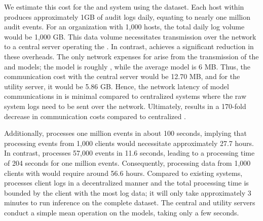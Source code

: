  We estimate this cost for the \flash and \kairos system using the \optc dataset. Each host within \optc produces approximately 1GB of audit logs daily, equating to nearly one million audit events. For an organization with 1,000 hosts, the total daily log volume would be 1,000 GB. This data volume necessitates transmission over the network to a central server operating the \pids. In contrast, \Sys achieves a significant reduction in these overheads. The only network expenses for \Sys arise from the transmission of the \gnnshort and \wordvec models; the \gnnshort model is roughly \modelsize, while the average \wordvec model is 6 MB. Thus, the communication cost with the central server would be 12.70 MB, and for the utility server, it would be 5.86 GB. Hence, the network latency of model communications in \Sys is minimal compared to centralized systems where the raw system logs need to be sent over the network. Ultimately, \Sys results in a 170-fold decrease in communication costs compared to centralized \pids.  

 Additionally, \flash processes one million events in about 100 seconds, implying that processing events from 1,000 clients would necessitate approximately 27.7 hours. In contrast, \kairos processes 57,000 events in 11.6 seconds, leading to a processing time of 204 seconds for one million events. Consequently, processing data from 1,000 clients with \kairos would require around 56.6 hours. Compared to existing systems, \Sys processes client logs in a decentralized manner and the total processing time is bounded by the client with the most log data; it will only take approximately 3 minutes to run inference on the complete \optc dataset. The central and utility servers conduct a simple mean operation on the models, taking only a few seconds.


